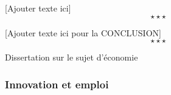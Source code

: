 
[Ajouter texte ici] $$\star \star \star$$


[Ajouter texte ici pour la CONCLUSION] $$\star \star \star$$


\newpage 
\begin{bclogo}[barre=none,logo={}]{Dissertation sur le sujet d'économie}
	\begin{center}
		\subsubsection*{Innovation et emploi}
	\end{center}
\end{bclogo}

